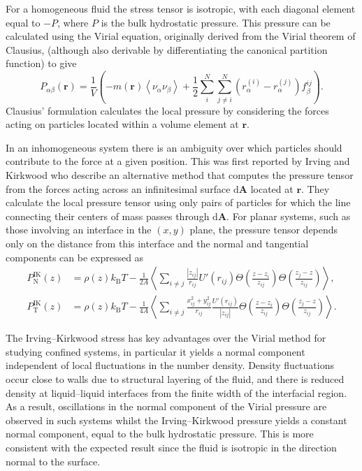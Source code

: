 For a homogeneous fluid the stress tensor is isotropic, with each diagonal element equal to $- P$, where $P$ is the bulk hydrostatic pressure. 
This pressure can be calculated using the Virial equation, originally derived from the Virial theorem of Clausius\cite{Clausius}, (although also derivable by differentiating the canonical partition function\cite{MolTheoryCap}) to give
\begin{equation}
\label{VirialPressure}
P_{\alpha \beta}(\mathbf{r})=\frac{1}{V} \left( -m(\mathbf{r})\left< \nu_{\alpha} \nu_{\beta} \right> + \frac{1}{2} \sum_{i}^{N} \sum_{j \neq i}^{N} (r_{\alpha}^{(i)} - r_{\alpha}^{(j)})f_{\beta}^{ij} \right).
\end{equation}
Clausius' formulation calculates the local pressure by considering the forces acting on particles located within a volume element at $\mathbf{r}$.

In an inhomogeneous system there is an ambiguity over which particles should contribute to the force at a given position.\cite{MolTheoryCap,VarnikBinder,Rowlinson1982}
This was first reported by Irving and Kirkwood\cite{IrvingKirkwood1949,IrvingKirkwood1950} who describe an alternative method that computes the pressure tensor from the forces acting across an infinitesimal surface $\mathrm{d}\mathbf{A}$ located at $\mathbf{r}$.
They calculate the local pressure tensor using only pairs of particles for which the line connecting their centers of mass passes through $\mathrm{d}\mathbf{A}$.
For planar systems, such as those involving an interface in the $(x,y)$ plane, the pressure tensor depends only on the distance from this interface and the normal and tangential components can be expressed as
\begin{align}
\label{IKpressureN}
P_{\mathrm{N}}^{\mathrm{IK}}(z) &= \rho(z)k_{\mathrm{B}}T-\frac{1}{2A} \left< \sum_{i \neq j} \frac{|z_{ij}|}{r_{ij}} U'(r_{ij}) \Theta \left( \frac{z-z_{i}}{z_{ij}}\right) \Theta \left( \frac{z_{j} - z}{z_{ij}} \right) \right>,\\
\label{IKpressureT}
P_{\mathrm{T}}^{\mathrm{IK}}(z) &= \rho(z)k_{\mathrm{B}}T-\frac{1}{4A} \left< \sum_{i \neq j} \frac{x^{2}_{ij} + y^{2}_{ij}}{r_{ij}} \frac{U'(r_{ij})}{|z_{ij}|} \Theta \left( \frac{z-z_{i}}{z_{ij}}\right) \Theta \left( \frac{z_{j} - z}{z_{ij}} \right) \right>.
\end{align}

The Irving--Kirkwood stress has key advantages over the Virial method for studying confined systems, in particular it yields a normal component independent of local fluctuations in the number density.
Density fluctuations occur close to walls due to structural layering of the fluid, and there is reduced density at liquid--liquid interfaces from the finite width of the interfacial region.
As a result, oscillations in the normal component of the Virial pressure are observed in such systems\cite{VarnikBinder} whilst the Irving--Kirkwood pressure yields a constant normal component, equal to the bulk hydrostatic pressure.
This is more consistent with the expected result since the fluid is isotropic in the direction normal to the surface.
